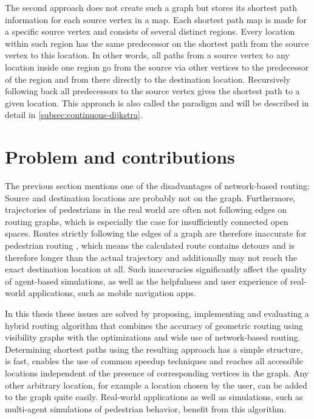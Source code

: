 	The second approach does not create such a graph but stores its shortest path information for each source vertex in a map.
	Each shortest path map is made for a specific source vertex and consists of several distinct regions.
	Every location within such region has the same predecessor on the shortest path from the source vertex to this location.
	In other words, all paths from a source vertex to any location inside one region go from the source via other vertices to the predecessor of the region and from there directly to the destination location.
	Recursively following back all predecessors to the source vertex gives the shortest path to a given location.
	This approach is also called the  paradigm and will be described in detail in \cref{subsec:continuous-dijkstra}.
	
\section{Problem and contributions}

	The previous section mentions one of the disadvantages of network-based routing:
	Source and destination locations are probably not on the graph.
	Furthermore, trajectories of pedestrians in the real world are often not following edges on routing graphs, which is especially the case for insufficiently connected open spaces.
	Routes strictly following the edges of a graph are therefore inaccurate for pedestrian routing \cite{graser-osm-open-spaces}, which means the calculated route contains detours and is therefore longer than the actual trajectory and additionally may not reach the exact destination location at all.
	Such inaccuracies significantly affect the quality of agent-based simulations, as well as the helpfulness and user experience of real-world applications, such as mobile navigation apps.

	In this thesis these issues are solved by proposing, implementing and evaluating a hybrid routing algorithm that combines the accuracy of geometric routing using visibility graphs with the optimizations and wide use of network-based routing.
	Determining shortest paths using the resulting approach has a simple structure, is fast, enables the use of common speedup techniques and reaches all accessible locations independent of the presence of corresponding vertices in the graph.
	Any other arbitrary location, for example a location chosen by the user, can be added to the graph quite easily.
	Real-world applications as well as simulations, such as multi-agent simulations of pedestrian behavior, benefit from this algorithm.
	
